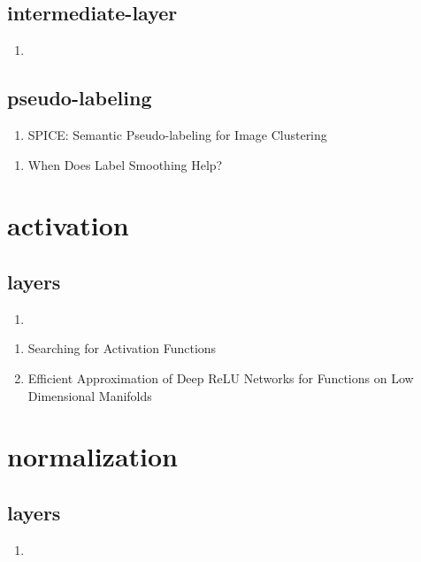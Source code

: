 \documentclass[acmlarge]{acmart}
\begin{document}
	\subsection{intermediate-layer}
	\begin{enumerate}
		\item
	\end{enumerate}
	\subsection{pseudo-labeling}
	\begin{enumerate}
		\item SPICE: Semantic Pseudo-labeling for Image Clustering \cite{Niu2021SPICESP} 

	\end{enumerate}
\begin{enumerate}
	\item When Does Label Smoothing Help? \cite{Mller2019WhenDL} 

\end{enumerate}
\section{activation}
	\subsection{layers}
	\begin{enumerate}
		\item
	\end{enumerate}
\begin{enumerate}
	\item Searching for Activation Functions \cite{Ramachandran2018SearchingFA} 

	\item Efficient Approximation of Deep ReLU Networks for Functions on Low Dimensional Manifolds \cite{Chen2019EfficientAO} 

\end{enumerate}
\section{normalization}
	\subsection{layers}
	\begin{enumerate}
		\item
	\end{enumerate}
\end{document}
